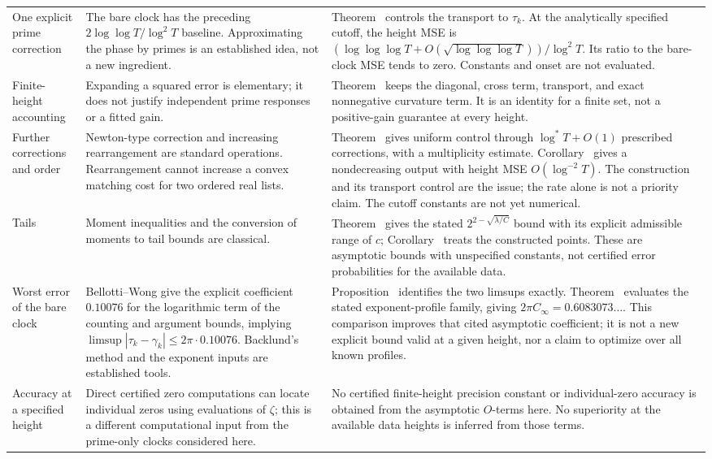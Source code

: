 \documentclass[preprint,12pt]{elsarticle}
\makeatletter
\let\CG@origref\ref
\newcommand{\CG@gettip}[1]{\@ifundefined{CGTip@#1}{Reference: #1}{\csname CGTip@#1\endcsname}}
\DeclareRobustCommand{\CGref}[1]{\pdftooltip{\CG@origref{#1}}{\CG@gettip{#1}}}
\numberwithin{equation}{section}
\theoremstyle{plain}
\theoremstyle{definition}
\theoremstyle{remark}
\makeatother
\begin{document}
\begin{longtable}{@{}p{}p{}p{}@{}}
One explicit prime correction
& The bare clock has the preceding $2\log\log T/\log^2T$ baseline. Approximating the phase by primes is an established idea, not a new ingredient.
& Theorem~\CGref{thm:computable_clock} controls the transport to $\tau_k$. At the analytically specified cutoff, the height MSE is $(\log\log\log T+O(\sqrt{\log\log\log T}))/\log^2T$. Its ratio to the bare-clock MSE tends to zero. Constants and onset are not evaluated.\\
Finite-height accounting
& Expanding a squared error is elementary; it does not justify independent prime responses or a fitted gain.
& Theorem~\CGref{thm:accounting} keeps the diagonal, cross term, transport, and exact nonnegative curvature term. It is an identity for a finite set, not a positive-gain guarantee at every height.\\
Further corrections and order
& Newton-type correction and increasing rearrangement are standard operations. Rearrangement cannot increase a convex matching cost for two ordered real lists.
& Theorem~\CGref{thm:uniform_iteration} gives uniform control through $\log^*T+O(1)$ prescribed corrections, with a multiplicity estimate. Corollary~\CGref{cor:sorted_clock} gives a nondecreasing output with height MSE $O(\log^{-2}T)$. The construction and its transport control are the issue; the rate alone is not a priority claim. The cutoff constants are not yet numerical.\\
Tails
& Moment inequalities and the conversion of moments to tail bounds are classical.
& Theorem~\CGref{thm:tails} gives the stated $2^{2-\sqrt{\lambda/C}}$ bound with its explicit admissible range of $c$; Corollary~\CGref{cor:clock_tails} treats the constructed points. These are asymptotic bounds with unspecified constants, not certified error probabilities for the available data.\\
Worst error of the bare clock
& Bellotti--Wong \cite[Thm.~1.1, Cor.~1.5]{BellottiWong2025} give the explicit coefficient $0.10076$ for the logarithmic term of the counting and argument bounds, implying $\limsup|\tau_k-\gamma_k|\le2\pi\cdot0.10076$. Backlund's method and the exponent inputs are established tools.
& Proposition~\CGref{prop:envelope_equivalence} identifies the two limsups exactly. Theorem~\CGref{thm:envelope} evaluates the stated exponent-profile family, giving $2\pi C_\infty=0.6083073\ldots$. This comparison improves that cited asymptotic coefficient; it is not a new explicit bound valid at a given height, nor a claim to optimize over all known profiles.\\
Accuracy at a specified height
& Direct certified zero computations can locate individual zeros using evaluations of $\zeta$; this is a different computational input from the prime-only clocks considered here.
& No certified finite-height precision constant or individual-zero accuracy is obtained from the asymptotic $O$-terms here. No superiority at the available data heights is inferred from those terms.\\
\end{longtable}
\endgroup
\end{document}
